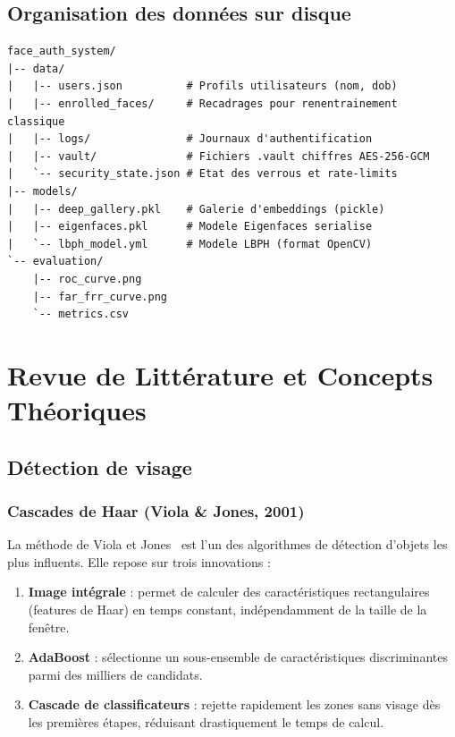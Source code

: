 \documentclass[12pt,a4paper]{article}
\begin{document}
\subsection{Organisation des données sur disque}

\begin{lstlisting}[language={},caption={Arborescence des données persistées}]
face_auth_system/
|-- data/
|   |-- users.json          # Profils utilisateurs (nom, dob)
|   |-- enrolled_faces/     # Recadrages pour renentrainement classique
|   |-- logs/               # Journaux d'authentification
|   |-- vault/              # Fichiers .vault chiffres AES-256-GCM
|   `-- security_state.json # Etat des verrous et rate-limits
|-- models/
|   |-- deep_gallery.pkl    # Galerie d'embeddings (pickle)
|   |-- eigenfaces.pkl      # Modele Eigenfaces serialise
|   `-- lbph_model.yml      # Modele LBPH (format OpenCV)
`-- evaluation/
    |-- roc_curve.png
    |-- far_frr_curve.png
    `-- metrics.csv
\end{lstlisting}

\section{Revue de Littérature et Concepts Théoriques}

\subsection{Détection de visage}

\subsubsection{Cascades de Haar (Viola \& Jones, 2001)}

La méthode de Viola et Jones~\cite{viola2001} est l'un des algorithmes de
détection d'objets les plus influents. Elle repose sur trois innovations :

\begin{enumerate}
  \item \textbf{Image intégrale} : permet de calculer des caractéristiques
        rectangulaires (features de Haar) en temps constant, indépendamment de
        la taille de la fenêtre.
  \item \textbf{AdaBoost} : sélectionne un sous-ensemble de caractéristiques
        discriminantes parmi des milliers de candidats.
  \item \textbf{Cascade de classificateurs} : rejette rapidement les zones sans
        visage dès les premières étapes, réduisant drastiquement le temps de
        calcul.
\end{enumerate}
\end{document}
